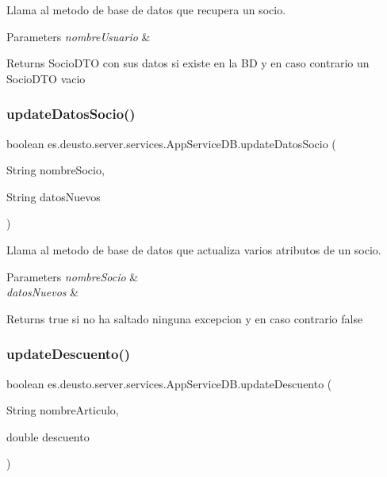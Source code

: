 Llama al metodo de base de datos que recupera un socio. 
\begin{DoxyParams}{Parameters}
{\em nombre\+Usuario} & \\
\hline
\end{DoxyParams}
\begin{DoxyReturn}{Returns}
Socio\+D\+TO con sus datos si existe en la BD y en caso contrario un Socio\+D\+TO vacio 
\end{DoxyReturn}
\mbox{\label{classes_1_1deusto_1_1server_1_1services_1_1_app_service_d_b_aad5d78a40512a94a4ef5f6203810899b}} 
\subsubsection{\texorpdfstring{updateDatosSocio()}{updateDatosSocio()}}
{\footnotesize\ttfamily boolean es.\+deusto.\+server.\+services.\+App\+Service\+D\+B.\+update\+Datos\+Socio (\begin{DoxyParamCaption}\item[{String}]{nombre\+Socio,  }\item[{String}]{datos\+Nuevos }\end{DoxyParamCaption})}

Llama al metodo de base de datos que actualiza varios atributos de un socio. 
\begin{DoxyParams}{Parameters}
{\em nombre\+Socio} & \\
\hline
{\em datos\+Nuevos} & \\
\hline
\end{DoxyParams}
\begin{DoxyReturn}{Returns}
true si no ha saltado ninguna excepcion y en caso contrario false 
\end{DoxyReturn}
\mbox{\label{classes_1_1deusto_1_1server_1_1services_1_1_app_service_d_b_a4839aca5b2ad04a8fc7616d1b96532e2}} 
\subsubsection{\texorpdfstring{updateDescuento()}{updateDescuento()}}
{\footnotesize\ttfamily boolean es.\+deusto.\+server.\+services.\+App\+Service\+D\+B.\+update\+Descuento (\begin{DoxyParamCaption}\item[{String}]{nombre\+Articulo,  }\item[{double}]{descuento }\end{DoxyParamCaption})}

